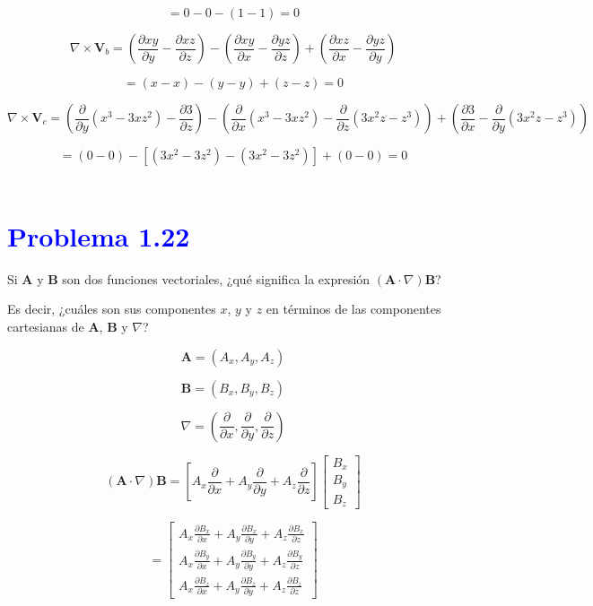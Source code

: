 \documentclass[12pt]{article}
\newcommand{\question}[1]{\textcolor{blue}{\textbf{#1}}}
\begin{document}
\[= 0 - 0 - (1 - 1) = 0\]

\[
\nabla \times \mathbf{V}_b = \left( \frac{\partial xy}{\partial y} - \frac{\partial xz}{\partial z} \right) - \left( \frac{\partial xy}{\partial x} - \frac{\partial yz}{\partial z} \right) + \left( \frac{\partial xz}{\partial x} - \frac{\partial yz}{\partial y} \right)
\]

\[= (x - x) - (y - y) + (z - z) = 0\]

\[
\nabla \times \mathbf{V}_c = \left( \frac{\partial}{\partial y} (x^3 - 3x z^2)  - \frac{\partial 3}{\partial z}\right) - \left( \frac{\partial}{\partial x} (x^3 - 3x z^2) - \frac{\partial}{\partial z} (3x^2 z - z^3) \right) + \left( \frac{\partial 3}{\partial x} - \frac{\partial}{\partial y} (3x^2 z - z^3) \right)
\]

\[= (0 - 0) - \left[ (3x^2 - 3z^2) - (3x^2 - 3z^2) \right] + (0 - 0) = 0\]\\

\section*{ \question{Problema 1.22}} Si \(\mathbf{A}\) y \(\mathbf{B}\) son dos funciones vectoriales, ¿qué significa la expresión \((\mathbf{A} \cdot \nabla) \mathbf{B}\)?

Es decir, ¿cuáles son sus componentes \(x\), \(y\) y \(z\) en términos de las componentes cartesianas de \(\mathbf{A}\), \(\mathbf{B}\) y \(\nabla\)?

\[
\mathbf{A} = (A_x, A_y, A_z)
\]

\[
\mathbf{B} = (B_x, B_y, B_z)
\]

\[
\nabla = \left( \frac{\partial}{\partial x}, \frac{\partial}{\partial y}, \frac{\partial}{\partial z} \right)
\]

\[
(\mathbf{A} \cdot \nabla) \mathbf{B} = \left[ A_x \frac{\partial}{\partial x} + A_y \frac{\partial}{\partial y} + A_z \frac{\partial}{\partial z} \right] 
\begin{bmatrix} B_x \\ B_y \\ B_z \end{bmatrix}
\]

\[
= 
\begin{bmatrix}
A_x \frac{\partial B_x}{\partial x} + A_y \frac{\partial B_x}{\partial y} + A_z \frac{\partial B_x}{\partial z} \\
A_x \frac{\partial B_y}{\partial x} + A_y \frac{\partial B_y}{\partial y} + A_z \frac{\partial B_y}{\partial z} \\
A_x \frac{\partial B_z}{\partial x} + A_y \frac{\partial B_z}{\partial y} + A_z \frac{\partial B_z}{\partial z}
\end{bmatrix}
\]
\end{document}
